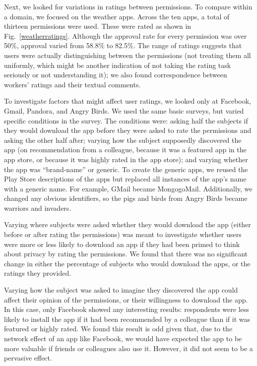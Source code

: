 \documentclass[11pt]{article}
\begin{document}
Next, we looked for variations in ratings between permissions. To
compare within a domain, we focused on the weather apps. Across the
ten apps, a total of thirteen permissions were used. These were rated
as shown in Fig.~\ref{weatherratings}.  Although the approval rate for
every permission was over 50\%, approval varied from 58.8\% to
82.5\%. The range of ratings suggests that users were actually
distinguishing between the permissions (not treating them all
uniformly, which might be another indication of not taking the rating
task seriously or not understanding it); we also found correspondence
between workers' ratings and their textual comments.

To investigate factors that might affect user ratings, we looked only at Facebook, Gmail,
Pandora, and Angry Birds.  We used the same basic surveys, but
varied specific conditions in the survey. The conditions 
were: asking half the subjects if they would download the app before 
they were asked to rate the permissions and asking the other half after; 
varying how the subject supposedly discovered the
app (on recommendation from a colleague, because it was a featured app in
the app store, or because it was highly rated in the app store); and
varying whether the app was ``brand-name'' or generic. To create the generic
apps, we reused the Play Store descriptions of the apps but replaced all
instances of the app's name with a generic name. For example, GMail
became MongogoMail.  Additionally, we changed any obvious identifiers,
so the pigs and birds from Angry Birds became warriors and invaders.

Varying where subjects were asked whether they would download the app 
(either before or after rating the permissions) was
meant to investigate whether users were more or less likely to
download an app if they had been primed to think about privacy by
rating the permissions. We found that there was no significant change
in either the percentage of subjects who would download the apps, or the
ratings they provided.

Varying how the subject was asked to imagine they discovered the app
could affect their opinion of the permissions, or their willingness to
download the app. In this case, only Facebook showed any interesting
results: respondents were less likely to install the app if it
had been recommended by a colleague than if it was featured or highly
rated. We found this result is odd given that, due to the network
effect of an app like Facebook, we would have expected the app to be more
valuable if friends or colleagues also use it. However, it did not
seem to be a pervasive effect.
\end{document}
